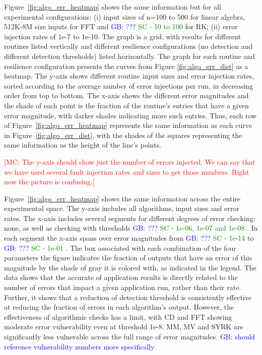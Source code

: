 \documentclass{sig-alternate}
\newcommand{\sui}[1]{%
  \textcolor{green}{SC - #1}
}
\newcommand{\marc}[1]{%
  \textcolor{red}{[MC: #1]}
}
\newcommand{\greg}[1]{%
  \textcolor{blue}{GB: #1}
}
\begin{document}
Figure~\ref{fig:algo_err_heatmap} shows the same information but for all experimental configurations: (i) input sizes of n=100 to 500 for linear algebra, 512K-8M size inputs for FFT and \greg{???} \sui{10 to 100} for RK; (ii) error injection rates of 1e-7 to 1e-10.
The graph is a grid, with results for different routines listed vertically and different resilience configurations (no detection and different detection thresholds) listed horizontally.
The graph for each routine and resilience configuration presents the curves from Figure \ref{fig:algo_err_dist} as a heatmap.
The y-axis shows different routine input sizes and error injection rates, sorted according to the average number of error injections per run, in decreasing order from top to bottom.
The x-axis shows the different error magnitudes and the shade of each point is the fraction of the routine's entries that have a given error magnitude, with darker shades indicating more such entries.
Thus, each row of Figure~\ref{fig:algo_err_heatmap} represents the same information as each curve in Figure~\ref{fig:algo_err_dist}, with the shades of the squares representing the same information as the height of the line's points.

\marc{The y-axis should show just the number of errors injected. We can say that we have used several fault injection rates and sizes to get those numbers. Right now the picture is confusing.}

Figure~\ref{fig:algo_err_heatmap} shows the same information across the entire experimental space.
The y-axis includes all algorithms, input sizes and error rates.
The x-axis includes several segments for different degrees of error checking: none, as well as checking with thresholds \greg{???} \sui{1e-06, 1e-07 and 1e-08}. In each segment the x-axis spans over error magnitudes from \greg{???} \sui{1e-14} to \greg{???} \sui{1e-01}.
The box associated with each combination of the four parameters the figure indicates the fraction of outputs that have an error of this magnitude by the shade of gray it is colored with, as indicated in the legend.
The data shows that the accurate of application results is directly related to the number of errors that impact a given application run, rather than their rate.
Further, it shows that a reduction of detection threshold is consistently effective at reducing the fraction of errors in each algorithm's output.
However, the effectiveness of algorithmic checks has a limit, with CD and FFT showing moderate error vulnerability even at threshold 1e-8.
MM, MV and SYRK are significantly less vulnerable across the full range of error magnitudes.
\greg{should reference vulnerability numbers more specifically}
\end{document}
